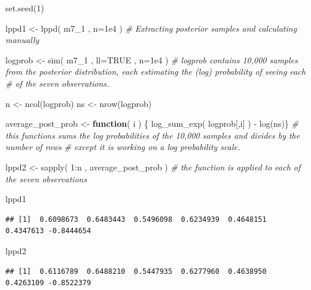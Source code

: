 \documentclass[
]{book}
\newenvironment{Shaded}{\begin{snugshade}}{\end{snugshade}}
\newcommand{\AttributeTok}[1]{\textcolor[rgb]{0.77,0.63,0.00}{#1}}
\newcommand{\CommentTok}[1]{\textcolor[rgb]{0.56,0.35,0.01}{\textit{#1}}}
\newcommand{\ConstantTok}[1]{\textcolor[rgb]{0.00,0.00,0.00}{#1}}
\newcommand{\ControlFlowTok}[1]{\textcolor[rgb]{0.13,0.29,0.53}{\textbf{#1}}}
\newcommand{\DecValTok}[1]{\textcolor[rgb]{0.00,0.00,0.81}{#1}}
\newcommand{\FloatTok}[1]{\textcolor[rgb]{0.00,0.00,0.81}{#1}}
\newcommand{\FunctionTok}[1]{\textcolor[rgb]{0.00,0.00,0.00}{#1}}
\newcommand{\NormalTok}[1]{#1}
\newcommand{\OtherTok}[1]{\textcolor[rgb]{0.56,0.35,0.01}{#1}}
\newcommand{\SpecialCharTok}[1]{\textcolor[rgb]{0.00,0.00,0.00}{#1}}
\begin{document}
\begin{Shaded}
\begin{Highlighting}[]
\FunctionTok{set.seed}\NormalTok{(}\DecValTok{1}\NormalTok{) }

\NormalTok{lppd1 }\OtherTok{\textless{}{-}} \FunctionTok{lppd}\NormalTok{( m7\_1 , }\AttributeTok{n=}\FloatTok{1e4}\NormalTok{ )}
\CommentTok{\# Extracting posterior samples and calculating manually}

\NormalTok{logprob }\OtherTok{\textless{}{-}} \FunctionTok{sim}\NormalTok{( m7\_1 , }\AttributeTok{ll=}\ConstantTok{TRUE}\NormalTok{ , }\AttributeTok{n=}\FloatTok{1e4}\NormalTok{ )   }\CommentTok{\# logprob contains 10,000 samples from the posterior distribution, each estimating the (log) probability of seeing each}
                                           \CommentTok{\# of the seven observations. }

\NormalTok{n }\OtherTok{\textless{}{-}} \FunctionTok{ncol}\NormalTok{(logprob) }
\NormalTok{ns }\OtherTok{\textless{}{-}} \FunctionTok{nrow}\NormalTok{(logprob) }

\NormalTok{average\_post\_prob }\OtherTok{\textless{}{-}} \ControlFlowTok{function}\NormalTok{( i ) \{}
    \FunctionTok{log\_sum\_exp}\NormalTok{( logprob[,i] ) }\SpecialCharTok{{-}} \FunctionTok{log}\NormalTok{(ns)\}     }\CommentTok{\# this functions sums the log probabilities of the 10,000 samples and divides by the number of rows}
                                              \CommentTok{\# except it is working on a log probability scale.}

\NormalTok{lppd2 }\OtherTok{\textless{}{-}} \FunctionTok{sapply}\NormalTok{( }\DecValTok{1}\SpecialCharTok{:}\NormalTok{n , average\_post\_prob )    }\CommentTok{\# the function is applied to each of the seven observations}

\NormalTok{lppd1}
\end{Highlighting}
\end{Shaded}

\begin{verbatim}
## [1]  0.6098673  0.6483443  0.5496098  0.6234939  0.4648151  0.4347613 -0.8444654
\end{verbatim}

\begin{Shaded}
\begin{Highlighting}[]
\NormalTok{lppd2}
\end{Highlighting}
\end{Shaded}

\begin{verbatim}
## [1]  0.6116789  0.6488210  0.5447935  0.6277960  0.4638950  0.4263109 -0.8522379
\end{verbatim}
\end{document}
